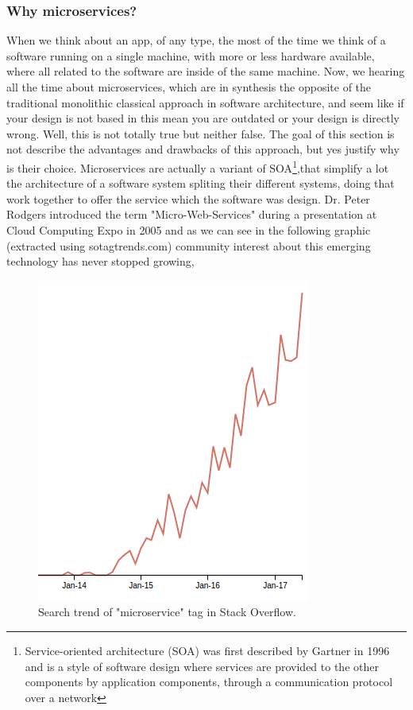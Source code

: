 \subsubsection{Why microservices?}

When we think about an app, of any type, the most of the time we think of a software
running on a single machine, with more or less hardware available, where all
related to the software are inside of the same machine.
\intro
Now, we hearing all the time about microservices, which are in synthesis the
opposite of the traditional monolithic classical approach in software architecture,
and seem like if your design is not based in this mean you are outdated or your design is directly wrong.
Well, this is not totally true but neither false. The goal of this section is
not describe the advantages and drawbacks of this approach, but yes justify why
is their choice.
\intro
Microservices are actually a variant of SOA\footnote{Service-oriented architecture (SOA)
was first described by Gartner in 1996 and is a style of software design where
services are provided to the other components by application components, through
a communication protocol over a network},that simplify a lot the architecture
of a software system spliting their different systems, doing that work together
to offer the service which the software was design.
Dr. Peter Rodgers introduced the term "Micro-Web-Services" during a presentation
at Cloud Computing Expo in 2005 and as we can see in the following graphic (extracted
using sotagtrends.com) community interest about this emerging technology
has never stopped growing,

\begin{figure}[H]
  \includegraphics[scale=0.5]{img/graphics/microservices_trend.png}
  \centering
  \caption{Search trend of "microservice" tag in Stack Overflow.}
\end{figure}

